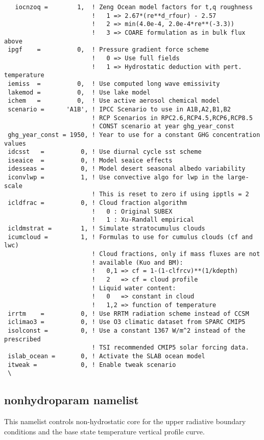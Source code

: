 {\begin{Verbatim}
   iocnzoq =        1,  ! Zeng Ocean model factors for t,q roughness
                        !   1 => 2.67*(re**d_rfour) - 2.57
                        !   2 => min(4.0e-4, 2.0e-4*re**(-3.3))
                        !   3 => COARE formulation as in bulk flux above
 ipgf    =          0,  ! Pressure gradient force scheme
                        !   0 => Use full fields
                        !   1 => Hydrostatic deduction with pert. temperature
 iemiss  =          0,  ! Use computed long wave emissivity
 lakemod =          0,  ! Use lake model
 ichem   =          0,  ! Use active aerosol chemical model
 scenario =      'A1B', ! IPCC Scenario to use in A1B,A2,B1,B2
                        ! RCP Scenarios in RPC2.6,RCP4.5,RCP6,RCP8.5
                        ! CONST scenario at year ghg_year_const
 ghg_year_const = 1950, ! Year to use for a constant GHG concentration values
 idcsst   =          0, ! Use diurnal cycle sst scheme
 iseaice  =          0, ! Model seaice effects
 idesseas =          0, ! Model desert seasonal albedo variability
 iconvlwp =          1, ! Use convective algo for lwp in the large-scale
                        ! This is reset to zero if using ipptls = 2
 icldfrac =          0, ! Cloud fraction algorithm
                        !   0 : Original SUBEX
                        !   1 : Xu-Randall empirical
 icldmstrat =        1, ! Simulate stratocumulus clouds
 icumcloud =         1, ! Formulas to use for cumulus clouds (cf and lwc)
                        ! Cloud fractions, only if mass fluxes are not
                        ! available (Kuo and BM):
                        !   0,1 => cf = 1-(1-clfrcv)**(1/kdepth)
                        !   2   => cf = cloud profile
                        ! Liquid water content:
                        !   0   => constant in cloud
                        !   1,2 => function of temperature
 irrtm    =          0, ! Use RRTM radiation scheme instead of CCSM
 iclimao3 =          0, ! Use O3 climatic dataset from SPARC CMIP5
 isolconst =         0, ! Use a constant 1367 W/m^2 instead of the prescribed
                        ! TSI recommended CMIP5 solar forcing data.
 islab_ocean =       0, ! Activate the SLAB ocean model
 itweak =            0, ! Enable tweak scenario
 \
\end{Verbatim}
}

\subsection{nonhydroparam namelist}

This namelist controls non-hydrostatic core for the upper radiative boundary
conditions and the base state temperature vertical profile curve.


